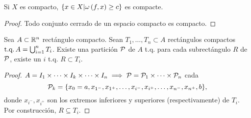 \begin{col*}
    Si $X$ es compacto, $\{x \in X | \omega \left( f, x \right) \geq c\}$ es compacte.
\end{col*}
\begin{proof}
    Todo conjunto cerrado de un espacio compacto es compacto.
\end{proof}
\begin{lema}
    Sea $A \subset \mathbb{R}^n$ rectángulo compacto. Sean $T_1, \dots, T_n \subset A$ rectángulos compactos $\operatorname{\text{t.q.}} A = \bigcup_{i=1}^n T_i$. Existe una partición $\mathcal{P}$ de $A$ t.q. para cada subrectángulo $R$ de $\mathcal{P}$, existe un $i$ t.q. $R \subset T_i$.
\end{lema}
\begin{proof}
    $A = I_1 \times \dots \times I_k \times \dots \times I_n \implies \mathcal{P} = \mathcal{P}_1 \times \dots \times \mathcal{P}_n$ cada
    \[ \mathcal{P}_k = \{x_0 = a, x_{1^-}, x_{1^+}, \dots, x_{i^-}, x_{i^+}, \dots, x_{n^-}, x_{n^+}, b\}, \]
    donde $x_{i^-}, x_{i^+}$ son los extremos inferiores y superiores (respectivamente) de $T_i$. Por construcción, $R \subseteq T_i$.
\end{proof}













